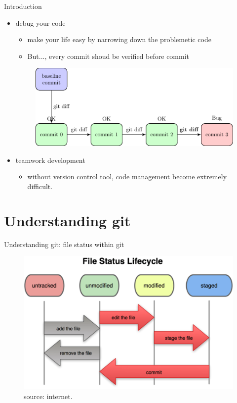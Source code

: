 \documentclass{beamer}
\begin{document}
\begin{frame}{Introduction}
    \begin{itemize}
      \item debug your code
        \begin{itemize}
            \item make your life easy by narrowing down the problemetic code      
            \item But..., every commit shoud be verified before commit        
        \end{itemize}          
        \begin{figure}
        \includegraphics[width=.7\textwidth]{figures/debugversioncontrol.pdf}
        \end{figure}         
     \item teamwork development
        \begin{itemize}
            \item without version control tool, code management become extremely difficult.
        \end{itemize}          
    \end{itemize} 
\end{frame}

\section{Understanding git}
\begin{frame}{Understanding git: file status within git}
    \begin{figure}
    \includegraphics[width=.7\textwidth]{figures/gitlifestyle.png}
    \caption{\label{git life cycle} source: internet.}
    \end{figure}             
\end{frame}
\end{document}
